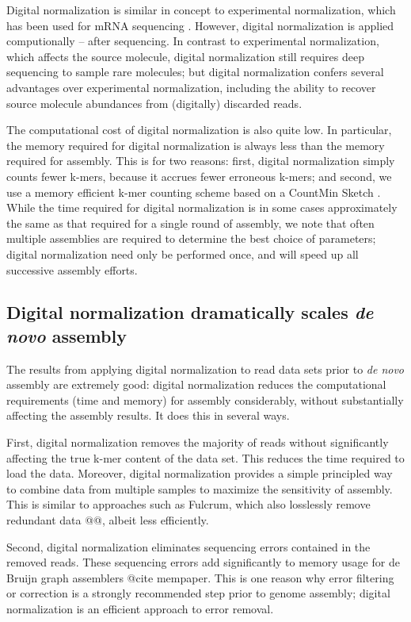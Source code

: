 \documentclass[10pt]{article}
\begin{document}
Digital normalization is similar in concept to experimental
normalization, which has been used for mRNA sequencing
\cite{pubmed8889548,pubmed7937745}. However, digital normalization is
applied computionally -- after sequencing.  In contrast to
experimental normalization, which affects the source molecule, digital
normalization still requires deep sequencing to sample rare molecules;
but digital normalization confers several advantages over experimental
normalization, including the ability to recover source molecule
abundances from (digitally) discarded reads.

The computational cost of digital normalization is also quite low.  In
particular, the memory required for digital normalization is always
less than the memory required for assembly.  This is for two reasons:
first, digital normalization simply counts fewer k-mers, because it
accrues fewer erroneous k-mers; and second, we use a memory efficient
k-mer counting scheme based on a CountMin Sketch
\cite{CountMinSketch}.  While the time required for digital
normalization is in some cases approximately the same as that required
for a single round of assembly, we note that often multiple assemblies
are required to determine the best choice of parameters; digital
normalization need only be performed once, and will speed up all
successive assembly efforts.

\subsection*{Digital normalization dramatically scales {\em de novo} assembly}

The results from applying digital normalization to read data sets
prior to {\em de novo} assembly are extremely good: digital normalization
reduces the computational requirements (time and memory) for assembly
considerably, without substantially affecting the assembly results.
It does this in several ways.

First, digital normalization removes the majority of reads without
significantly affecting the true k-mer content of the data set.  This
reduces the time required to load the data.  Moreover, digital
normalization provides a simple principled way to combine data from
multiple samples to maximize the sensitivity of assembly.  This is
similar to approaches such as Fulcrum, which also losslessly remove
redundant data @@, albeit less efficiently.

Second, digital normalization eliminates sequencing errors contained
in the removed reads.  These sequencing errors add significantly to
memory usage for de Bruijn graph assemblers @cite mempaper.  This is
one reason why error filtering or correction is a strongly recommended
step prior to genome assembly; digital normalization is an efficient
approach to error removal.
\end{document}
